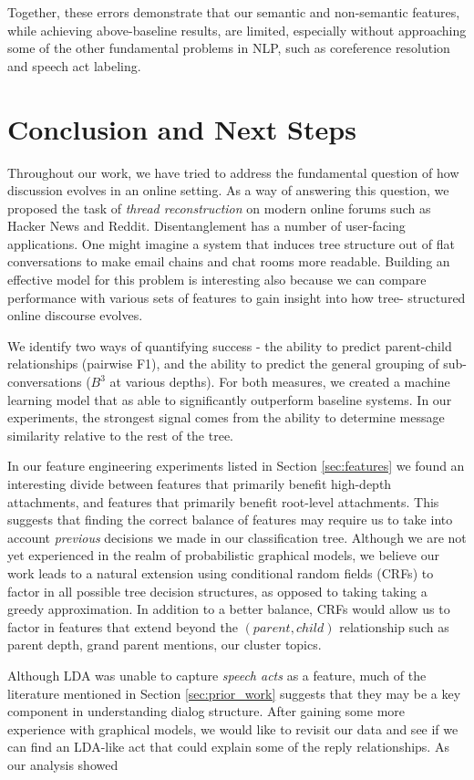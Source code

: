 \documentclass{article}
\begin{document}
Together, these errors demonstrate that our semantic and non-semantic 
features, while achieving above-baseline results, are limited, especially 
without approaching some of the other fundamental problems in NLP, such as 
coreference resolution and speech act labeling.

\section{Conclusion and Next Steps}
Throughout our work, we have tried to address the fundamental question of how
discussion evolves in an online setting. As a way of answering this question,
we proposed the task of \textit{thread reconstruction} on modern online forums
such as Hacker News and Reddit. Disentanglement has a number of user-facing
applications. One might imagine a system that induces tree structure out of
flat conversations to make email chains and chat rooms more readable. Building
an effective model for this problem is interesting also because we can compare
performance with various sets of features to gain insight into how tree-
structured online discourse evolves.

We identify two ways of quantifying success - the ability to
predict parent-child relationships (pairwise F1), and the ability to 
predict the general grouping of sub-conversations ($B^3$ at various depths). For
both measures, we created a machine learning model that as able to significantly 
outperform baseline systems. In our experiments, the strongest signal comes from
the ability to determine message similarity relative to the rest of the tree.

In our feature engineering experiments listed in Section \ref{sec:features} we
found an interesting divide between features that primarily benefit high-depth
attachments, and features that primarily benefit root-level attachments. This
suggests that finding the correct balance of features may require us to take
into account \textit{previous} decisions we made in our classification tree.
Although we are not yet experienced in the realm of probabilistic graphical
models, we believe our work leads to a natural extension using conditional
random fields (CRFs) to factor in all possible tree decision structures, as
opposed to taking taking a greedy approximation. In addition to a better
balance, CRFs would allow us to factor in features that extend beyond the
$(parent,child)$ relationship such as parent depth, grand parent mentions, our
cluster topics.

Although LDA was unable to capture \textit{speech acts} as a feature, much of
the literature mentioned in Section \ref{sec:prior_work} suggests that they
may be a key component in understanding dialog structure. After gaining some
more experience with graphical models, we would like to revisit our data and
see if we can find an LDA-like act that could explain some of the reply
relationships. As our analysis showed
\end{document}
